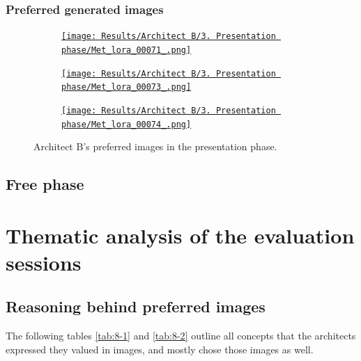 \subsubsection{Preferred generated images}
\begin{figure}[H]
    \centering
    \begin{subfigure}[b]{0.3\textwidth}
        \centering
        \href{https://github.com/matijspeeters/Thesis/blob/main/Images/Results/Architect%20B/3.%20Presentation%20phase/Met_lora_00071_.png}{\texttt{[image: Results/Architect B/3. Presentation phase/Met\_lora\_00071\_.png]}}
        \caption{}
        \label{fig:B-presentation-preferred-a}
    \end{subfigure}
    \hfill
    \begin{subfigure}[b]{0.3\textwidth}
        \centering
        \href{https://github.com/matijspeeters/Thesis/blob/main/Images/Results/Architect%20B/3.%20Presentation%20phase/Met_lora_00073_.png}{\texttt{[image: Results/Architect B/3. Presentation phase/Met\_lora\_00073\_.png]}}
        \caption{}
        \label{fig:B-presentation-preferred-b}
    \end{subfigure}
    \hfill
    \begin{subfigure}[b]{0.3\textwidth}
        \centering
        \href{https://github.com/matijspeeters/Thesis/blob/main/Images/Results/Architect%20B/3.%20Presentation%20phase/Met_lora_00074_.png}{\texttt{[image: Results/Architect B/3. Presentation phase/Met\_lora\_00074\_.png]}}
        \caption{}
        \label{fig:B-presentation-preferred-c}
    \end{subfigure}
    \caption{Architect B's preferred images in the presentation phase.}
    \label{fig:B-presentation-preferred}
\end{figure}
\subsection{Free phase}

\section{Thematic analysis of the evaluation sessions}\label{sec:results-analysis}
\subsection{Reasoning behind preferred images}
The following tables \ref{tab:8-1} and \ref{tab:8-2} outline all concepts that the architects expressed they valued in images, and mostly chose those images as well.

